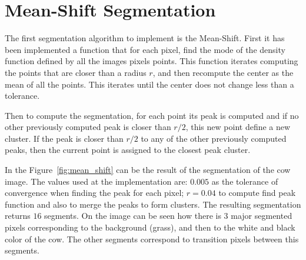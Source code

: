 \documentclass{ethz_report}
\begin{document}
\section*{Mean-Shift Segmentation}

The first segmentation algorithm to implement is the Mean-Shift. First it has been implemented a function that for each pixel, find the mode of the density function defined by all the images pixels points.
This function iterates computing the points that are closer than a radius $r$, and then recompute the center as the mean of all the points.
This iterates until the center does not change less than a tolerance.

Then to compute the segmentation, for each point its peak is computed and if no other previously computed peak is closer than $r/2$, this new point define a new cluster.
If the peak is closer than $r/2$ to any of the other previously computed peaks, then the current point is assigned to the closest peak cluster.

In the Figure~\ref{fig:mean_shift} can be the result of the segmentation of the cow image.
The values used at the implementation are: $0.005$ as the tolerance of convergence when finding the peak for each pixel; $r = 0.04$ to compute find peak function and also to merge the peaks to form clusters.
The resulting segmentation returns $16$ segments. On the image can be seen how there is 3 major segmented pixels corresponding to the background (grass), and then to the white and black color of the cow. The other segments correspond to transition pixels between this segments.
\end{document}
